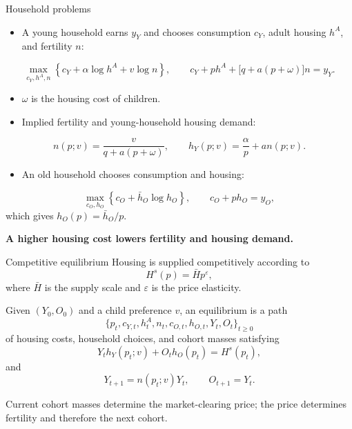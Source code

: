 \documentclass[11pt,aspectratio=169]{beamer}
\begin{document}
\begin{frame}{Household problems}
\small
\begin{itemize}
  \item A young household earns $y_Y$ and chooses consumption $c_Y$, adult housing $h^A$, and fertility $n$:
\end{itemize}
\[
\max_{c_Y,h^A,n}\left\{c_Y+\alpha\log h^A+v\log n\right\},
\qquad
c_Y+ph^A+\big[q+a(p+\omega)\big]n=y_Y.
\]
\begin{itemize}
  \item $\omega$ is the housing cost of children.
  \item Implied fertility and young-household housing demand:
\end{itemize}
\[
n(p;v)=\frac{v}{q+a(p+\omega)},
\qquad
h_Y(p;v)=\frac{\alpha}{p}+a n(p;v).
\]

\begin{itemize}
  \item An old household chooses consumption and housing:
\end{itemize}
\[
\max_{c_O,h_O}\left\{c_O+\bar h_O\log h_O\right\},
\qquad
c_O+ph_O=y_O,
\]
which gives $h_O(p)=\bar h_O/p$.

\textbf{A higher housing cost lowers fertility and housing demand.}
\end{frame}

\begin{frame}{Competitive equilibrium}
\small
Housing is supplied competitively according to
\[
H^s(p)=\bar H p^\varepsilon,
\]
where $\bar H$ is the supply scale and $\varepsilon$ is the price elasticity.

Given $(Y_0,O_0)$ and a child preference $v$, an equilibrium is a path
\[
\{p_t,c_{Y,t},h^A_t,n_t,c_{O,t},h_{O,t},Y_t,O_t\}_{t\geq0}
\]
of housing costs, household choices, and cohort masses satisfying
\[
Y_t h_Y(p_t;v)+O_t h_O(p_t)=H^s(p_t),
\]
and
\[
Y_{t+1}=n(p_t;v)Y_t,
\qquad
O_{t+1}=Y_t.
\]

Current cohort masses determine the market-clearing price; the price determines fertility and therefore the next cohort.
\end{frame}
\end{document}
